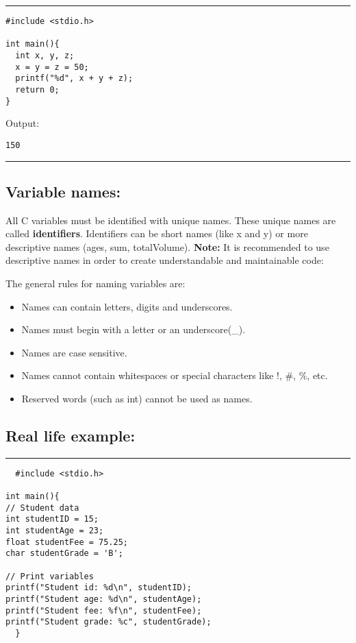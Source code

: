 \documentclass[a4paper]{article}
\begin{document}
\noindent\rule{\textwidth}{0.5pt}
\begin{verbatim}
#include <stdio.h>

int main(){
  int x, y, z;
  x = y = z = 50;
  printf("%d", x + y + z);
  return 0;
}
\end{verbatim}
Output:
\begin{verbatim}
150
\end{verbatim}

\noindent\rule{\textwidth}{0.5pt}

\subsection{Variable names:}
\label{sec:org4cf379b}
All C variables must be identified with unique names.
These unique names are called \textbf{identifiers}.
Identifiers can be short names (like x and y) or more descriptive names (ages,
sum, totalVolume).
\textbf{Note:} It is recommended to use descriptive names in order to create
understandable and maintainable code:

The general rules for naming variables are:
\begin{itemize}
\item Names can contain letters, digits and underscores.
\item Names must begin with a letter or an underscore(\_).
\item Names are case sensitive.
\item Names cannot contain whitespaces or special characters like !, \#, \%, etc.
\item Reserved words (such as int) cannot be used as names.
\end{itemize}

\subsection{Real life example:}
\label{sec:org008c4f3}
\noindent\rule{\textwidth}{0.5pt}
\begin{verbatim}
  #include <stdio.h>

int main(){
// Student data
int studentID = 15;
int studentAge = 23;
float studentFee = 75.25;
char studentGrade = 'B';

// Print variables
printf("Student id: %d\n", studentID);
printf("Student age: %d\n", studentAge);
printf("Student fee: %f\n", studentFee);
printf("Student grade: %c", studentGrade);
  }
\end{verbatim}
\end{document}
